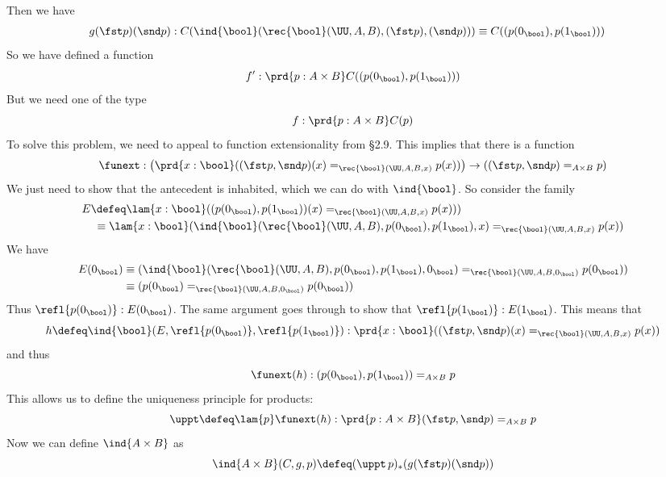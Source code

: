 Then we have
\begin{align*}
g(\fst p)(\snd p) 
&: C(\ind{\bool}(\rec{\bool}(\UU, A, B), (\fst p), (\snd p)))
\equiv 
C((p(0_{\bool}), p(1_{\bool})))
\end{align*}
So we have defined a function
\[
f' : \prd{p : A \times B} C((p(0_{\bool}), p(1_{\bool})))
\]
But we need one of the type
\[
f : \prd{p : A \times B} C(p)
\]
To solve this problem, we need to appeal to function extensionality from \S2.9.
This implies that there is a function
\[
\funext : 
\left(\prd{x:\bool} ((\fst p, \snd p)(x) =_{\rec{\bool}(\UU, A, B, x)} p(x))\right)
\to 
((\fst p, \snd p) =_{A \times B} p)
\]
We just need to show that the antecedent is inhabited, which we can do with
$\ind{\bool}$.  So consider the family
\begin{align*}
E &\defeq 
\lam{x : \bool} 
((p(0_{\bool}), p(1_{\bool}))(x) =_{\rec{\bool}(\UU, A, B, x)}  p(x)))
\\&\phantom{:}\equiv
\lam{x : \bool} 
(\ind{\bool}(\rec{\bool}(\UU, A, B), p(0_{\bool}), p(1_{\bool}), x)
=_{\rec{\bool}(\UU, A, B, x)} p(x))
\end{align*}
We have
\begin{align*}
E(0_{\bool})
&\equiv
(\ind{\bool}(\rec{\bool}(\UU, A, B),
p(0_{\bool}), p(1_{\bool}), 0_{\bool}) =_{\rec{\bool}(\UU, A, B, 0_{\bool})}
p(0_{\bool}))
\\&\equiv
(p(0_{\bool}) =_{\rec{\bool}(\UU, A, B, 0_{\bool})} p(0_{\bool}))
\end{align*}
Thus $\refl{p(0_{\bool})} : E(0_{\bool})$.  The same argument goes through to
show that $\refl{p(1_{\bool})} : E(1_{\bool})$.  This means that
\[
h \defeq
\ind{\bool}(E, \refl{p(0_{\bool})}, \refl{p(1_{\bool})})
:
\prd{x : \bool} ((\fst p, \snd p)(x) =_{\rec{\bool}(\UU, A, B, x)} p(x))
\]
and thus
\[
\funext(h) 
: 
(p(0_{\bool}), p(1_{\bool}))
=_{A \times B} 
p 
\]
This allows us to define the uniqueness principle for products:
\[
  \uppt \defeq \lam{p}\funext(h)  
  : \prd{p:A \times B} 
  (\fst p, \snd p)
  =_{A \times B} 
  p 
\]
Now we can define $\ind{A\times B}$ as
\[
  \ind{A\times B}(C, g, p) \defeq (\uppt\, p)_{*}(g(\fst p)(\snd p))
\]
